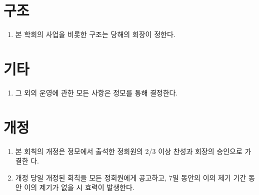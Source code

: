\documentclass{oblivoir}
\begin{document}
\section{구조}
\begin{enumerate}
    \item  본 학회의 사업을 비롯한 구조는 당해의 회장이 정한다.
\end{enumerate}

\section{기타}
\begin{enumerate}
    \item  그 외의 운영에 관한 모든 사항은 정모를 통해 결정한다.
\end{enumerate}

\section{개정}
\begin{enumerate}
    \item  본 회칙의 개정은 정모에서 출석한 정회원의 2/3 이상 찬성과 회장의 승인으로 가결한
          다.
    \item  개정 당일 개정된 회칙을 모든 정회원에게 공고하고, 7일 동안의 이의 제기 기간 동안
          이의 제기가 없을 시 효력이 발생한다.
\end{enumerate}
\end{document}
